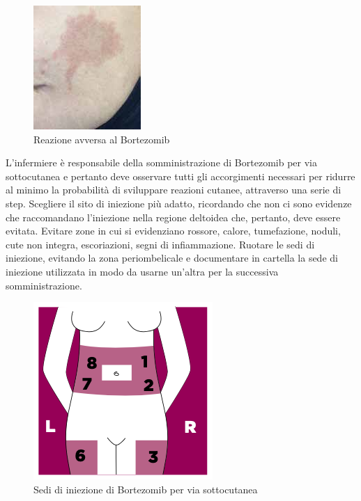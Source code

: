 \begin{figure}[H]
    \begin{center}
    \includegraphics[width=0.3\columnwidth]{img/bortezomib reaction2.jpeg}
    \end{center}
    \caption[ Reazione avversa al Bortezomib]{ Reazione avversa al Bortezomib
    \cite{img31}}

\end{figure}

L’infermiere è responsabile della somministrazione di Bortezomib per via sottocutanea e pertanto deve osservare tutti 
gli accorgimenti necessari per ridurre al minimo la probabilità di sviluppare reazioni cutanee, attraverso una serie 
di step. Scegliere il sito di iniezione più adatto, ricordando che non ci sono evidenze che raccomandano l’iniezione 
nella regione deltoidea che, pertanto, deve essere evitata. Evitare zone in cui si evidenziano rossore, calore, 
tumefazione, noduli, cute non integra, escoriazioni, segni di infiammazione. Ruotare le sedi di iniezione, evitando 
la zona periombelicale e documentare in cartella la sede di iniezione utilizzata in modo da usarne 
un’altra per la successiva somministrazione\cite{BORTNURSES}.\\

\begin{figure}[H]
    \begin{center}
    \includegraphics[width=0.4\columnwidth]{img/SEDI.png}
    \end{center}
    \caption[ Sedi di iniezione di Bortezomib per via sottocutanea]{ Sedi di iniezione di Bortezomib per via sottocutanea
    \cite{img32}}

\end{figure}

